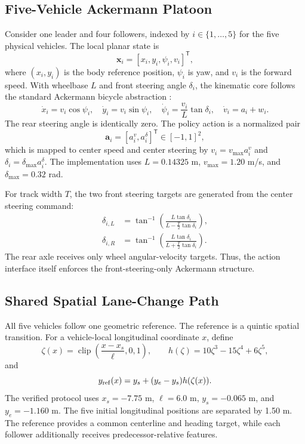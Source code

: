 \documentclass[lettersize,journal]{IEEEtran}
\newcommand{\vect}[1]{\boldsymbol{#1}}
\begin{document}
\subsection{Five-Vehicle Ackermann Platoon}
Consider one leader and four followers, indexed by $i\in\{1,\ldots,5\}$ for the five physical vehicles. The local planar state is
\begin{equation}
\vect{x}_i=[x_i,y_i,\psi_i,v_i]^{\mathsf T},
\end{equation}
where $(x_i,y_i)$ is the body reference position, $\psi_i$ is yaw, and $v_i$ is the forward speed. With wheelbase $L$ and front steering angle $\delta_i$, the kinematic core follows the standard Ackermann bicycle abstraction \cite{rajamani2012vehicle}:
\begin{equation}
\dot{x}_i=v_i\cos\psi_i,\quad
\dot{y}_i=v_i\sin\psi_i,\quad
\dot{\psi}_i=\frac{v_i}{L}\tan\delta_i,\quad
\dot{v}_i=a_i+w_i.
\label{eq:ackermann}
\end{equation}
The rear steering angle is identically zero. The policy action is a normalized pair
\begin{equation}
\vect{a}_i=[a_i^{v},a_i^{\delta}]^{\mathsf T}\in[-1,1]^2,
\end{equation}
which is mapped to center speed and center steering by
$v_i=v_{\max}a_i^v$ and $\delta_i=\delta_{\max}a_i^\delta$. The implementation uses $L=0.14325$ m, $v_{\max}=1.20$ m/s, and $\delta_{\max}=0.32$ rad.

For track width $T$, the two front steering targets are generated from the center steering command:
\begin{align}
\delta_{i,L}
&=\tan^{-1}\left(\frac{L\tan\delta_i}
 {L-\frac{T}{2}\tan\delta_i}\right),\\
\delta_{i,R}
&=\tan^{-1}\left(\frac{L\tan\delta_i}
 {L+\frac{T}{2}\tan\delta_i}\right).
\label{eq:inner_wheel}
\end{align}
The rear axle receives only wheel angular-velocity targets. Thus, the action interface itself enforces the front-steering-only Ackermann structure.

\subsection{Shared Spatial Lane-Change Path}
All five vehicles follow one geometric reference. The reference is a quintic spatial transition. For a vehicle-local longitudinal coordinate $x$, define
\begin{equation}
\zeta(x)=\operatorname{clip}\left(\frac{x-x_s}{\ell},0,1\right),\qquad
h(\zeta)=10\zeta^3-15\zeta^4+6\zeta^5,
\end{equation}
and
\begin{equation}
y_{\rm ref}(x)=y_s+(y_e-y_s)h(\zeta(x)).
\label{eq:quintic}
\end{equation}
The verified protocol uses $x_s=-7.75$ m, $\ell=6.0$ m, $y_s=-0.065$ m, and $y_e=-1.160$ m. The five initial longitudinal positions are separated by 1.50 m. The reference provides a common centerline and heading target, while each follower additionally receives predecessor-relative features.
\end{document}
